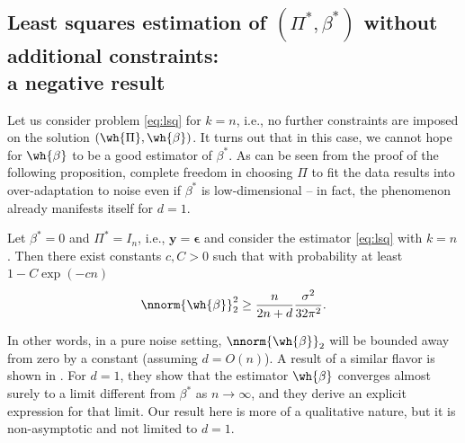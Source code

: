 \documentclass[11pt]{article}
\def\eps{\boldsymbol{\epsilon}}
\begin{document}
\subsection{Least squares estimation of $(\Pi^*, \beta^*)$ without additional constraints:\\ a negative result}

Let us consider problem \eqref{eq:lsq} for $k = n$, i.e., no further constraints are imposed on the solution $(\wh{\Pi}, \wh{\beta})$. It turns out that in this case, we cannot hope for $\wh{\beta}$ to be a good estimator of $\beta^*$. As can be seen from the proof of the following proposition, complete freedom in choosing $\Pi$ to fit the data results into over-adaptation to noise even if $\beta^*$ is low-dimensional -- in fact, the phenomenon already manifests itself for $d = 1$.
\begin{prop}\label{prop:negative_result} Let $\beta^* = 0$ and $\Pi^* = I_n$, i.e., $\mathbf{y} = \eps$ and consider the estimator \eqref{eq:lsq} with $k = n$. Then there exist constants $c,C > 0$ such that with probability at least $1 - C \exp(-c n)$
\begin{equation*}
\nnorm{\wh{\beta}}_2^2 \geq \frac{n}{2n + d}\frac{\sigma^2}{32\pi^2}.
\end{equation*} 
\end{prop}   
\noindent In other words, in a pure noise setting, $\nnorm{\wh{\beta}}_2$ will be bounded away from zero by a constant (assuming $d = O(n)$). A result of a similar flavor is shown in \cite{Abid2017}. For $d = 1$, they show that the estimator $\wh{\beta}$ converges almost surely to a limit different from $\beta^*$ as $n \rightarrow \infty$, and they derive an explicit expression for that limit. Our result here is more of a qualitative nature, but it is non-asymptotic and not limited to $d = 1$. 
\end{document}
